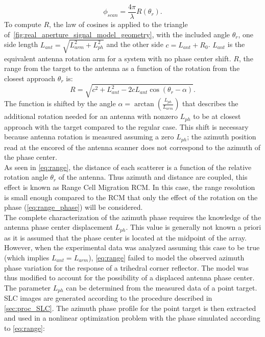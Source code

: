 \begin{equation}\label{eq:range_phase}
	\phi_{scan} = \frac{4 \pi}{\lambda}R\left(\theta_r\right).
\end{equation}
To compute $R$, the law of cosines is applied to the triangle of~\autoref{fig:real_aperture_signal_model_geometry}, with the included angle $\theta_r$, one side length $L_{ant} = \sqrt{L_{arm}^2 + L_{ph}^2}$ and the other side $c = L_{ant} + R_0$.  $L_{ant}$ is the equivalent antenna rotation arm for a system with no phase center shift.
$R$, the range from the target to the antenna as a function of the rotation from the closest approach $\theta_r$ is:
\begin{equation}\label{eq:range}
	R = \sqrt{ c^2 +  L_{ant}^2 - 2 c L_{ant} \cos{\left(\theta_r - \alpha\right)}}.
\end{equation}
The function is shifted by the angle  $\alpha = \operatorname{\arctan}\left({\frac{L_{ph}}{L_{arm}}}\right)$ that describes the additional rotation needed for an antenna with nonzero $L_{ph}$ to be at closest approach with the target compared to the regular case. This shift is necessary because antenna rotation is measured assuming a zero $L_{ph}$; the azimuth position read at the encored of the antenna scanner does not correspond to the azimuth of the phase center.\\
As seen in \autoref{eq:range}, the distance of each scatterer is a function of the relative rotation angle $\theta_r$ of the antenna. Thus azimuth and distance are coupled, this effect is known as Range Cell Migration RCM. In this case, the range resolution is small enough compared to the RCM that only the effect of the rotation on the phase (\autoref{eq:range_phase}) will be considered.\\
The complete characterization of the azimuth phase requires the knowledge of the antenna phase center displacement $L_{ph}$. This value is generally not known a priori as it is assumed that the phase center is located at the midpoint of the array. However, when the experimental data was analyzed assuming this case to be true (which implies $L_{ant} = L_{arm}$),  \autoref{eq:range} failed to model the observed azimuth phase variation for the response of a trihedral corner reflector. The model was thus modified to account for the possibility of a displaced antenna phase center. The parameter $L_{ph}$ can be determined from the measured data of a point target. SLC images are generated according to the procedure described in \autoref{sec:proc_SLC}. The azimuth phase profile for the point target is then extracted and used in a nonlinear optimization problem with the phase simulated according to \autoref{eq:range}:

